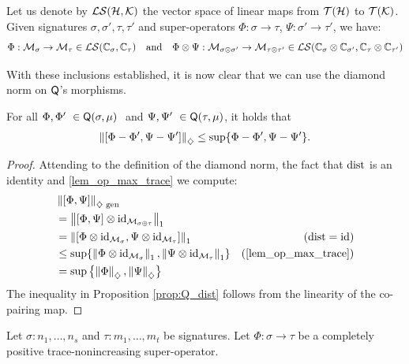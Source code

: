 Let us denote by $\mathcal{LS}(\mathcal{H}, \mathcal{K})$ the vector space of linear maps from $\mathcal{T}(\mathcal{H})$ to $\mathcal{T}(\mathcal{K})$. Given signatures $\sigma, \sigma', \tau, \tau'$ and super-operators $\Phi \colon \sigma \to \tau$, $\Psi \colon \sigma' \to \tau'$, we have:
\[
\Phi: \mathcal{M}_{\sigma} \to \mathcal{M}_{\tau} \in \mathcal{LS}(\mathbb{C}_{\sigma}, \mathbb{C}_{\tau})
\quad \text{and} \quad
\Phi \otimes \Psi : \mathcal{M}_{\sigma \otimes \sigma'} \to \mathcal{M}_{\tau \otimes \tau'} \in  \mathcal{LS}(\mathbb{C}_{\sigma} \otimes \mathbb{C}_{\sigma'} , \mathbb{C}_{\tau} \otimes \mathbb{C}_{\tau'})
\]

With these inclusions established, it is now clear that we can use the diamond norm on $\mathsf{Q}$'s morphisms.


\begin{proposition} \label{prop:Q_dist}
  For all $\Phi, \Phi' \in \catQ(\sigma,\mu)  $ and $\Psi, \Psi' \in \catQ(\tau,\mu) $, it holds that
  $$ \left\lVert [\Phi-\Phi',\Psi-\Psi'] \right\rVert_{\diamondsuit} \leq \sup\{\Phi-\Phi',  \Psi-\Psi' \}.$$
\end{proposition}

\begin{proof}
  Attending to the definition of the diamond norm, the fact that $\mathrm{dist}$ is an identity  and \autoref{lem_op_max_trace} we compute:
    \begin{align*}
      & \gendiamondnorm{[\Phi, \Psi]} \\
      &= \tracenorm{[\Phi, \Psi] \otimes \id_{\SqMatrix{\sigma\oplus\tau}}} \\
      &= \tracenorm{[\Phi \otimes \id_{\SqMatrix{\sigma}}, \Psi \otimes \id_{\SqMatrix{\tau}}]}& (\dist=\id) \\
      & \leq  \sup \{ \tracenorm{\Phi \otimes \id_{\SqMatrix{\sigma}}}, \tracenorm{\Psi \otimes \id_{\SqMatrix{\tau}} }\} & (\text{\autoref{lem_op_max_trace}})\\
      & = \sup \left\{ \diamondnorm{\Phi}, \diamondnorm{\Psi} \right\}
    \end{align*}
The inequality in Proposition \ref{prop:Q_dist} follows from the linearity of the co-pairing map.
\end{proof}


  \begin{corollary} \label{cor:gen_diamond_cptp_norm}
    Let $\sigma: n_1, \ldots, n_s$ and  $\tau: m_1, \ldots, m_t$  be signatures. Let  $\Phi: \sigma  \rightarrow \tau$ be a  completely positive trace-nonincreasing super-operator. 
  \end{corollary}
 

